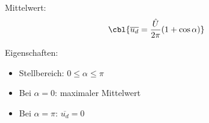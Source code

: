 Mittelwert:
\[
\cbl{\overline{u_d} = \frac{\hat U}{2\pi}(1+\cos\alpha)}
\]

Eigenschaften:
\begin{itemize}
    \item Stellbereich: $0 \le \alpha \le \pi$
    \item Bei $\alpha = 0$: maximaler Mittelwert
    \item Bei $\alpha = \pi$: $\overline{u_d} = 0$
\end{itemize}

